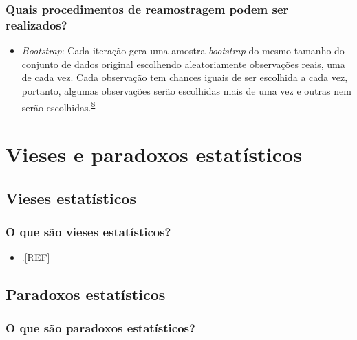 \documentclass[
  a4paper,
]{book}
\providecommand{\tightlist}{%
  \setlength{\itemsep}{0pt}\setlength{\parskip}{0pt}}
\begin{document}
\hypertarget{quais-procedimentos-de-reamostragem-podem-ser-realizados}{%
\subsection{Quais procedimentos de reamostragem podem ser realizados?}\label{quais-procedimentos-de-reamostragem-podem-ser-realizados}}

\begin{itemize}
\tightlist
\item
  \emph{Bootstrap}: Cada iteração gera uma amostra \emph{bootstrap} do mesmo tamanho do conjunto de dados original escolhendo aleatoriamente observações reais, uma de cada vez. Cada observação tem chances iguais de ser escolhida a cada vez, portanto, algumas observações serão escolhidas mais de uma vez e outras nem serão escolhidas.\textsuperscript{\protect\hyperlink{ref-Bland2015}{8}}
\end{itemize}

\hypertarget{vieses-paradoxos-estatuxedsticos}{%
\chapter{\texorpdfstring{\textbf{Vieses e paradoxos estatísticos}}{Vieses e paradoxos estatísticos}}\label{vieses-paradoxos-estatuxedsticos}}

\hypertarget{vieses-estatisticos}{%
\section{Vieses estatísticos}\label{vieses-estatisticos}}

\hypertarget{o-que-suxe3o-vieses-estatuxedsticos}{%
\subsection{O que são vieses estatísticos?}\label{o-que-suxe3o-vieses-estatuxedsticos}}

\begin{itemize}
\tightlist
\item
  .{[}REF{]}
\end{itemize}

\hypertarget{paradoxos}{%
\section{Paradoxos estatísticos}\label{paradoxos}}

\hypertarget{o-que-suxe3o-paradoxos-estatuxedsticos}{%
\subsection{O que são paradoxos estatísticos?}\label{o-que-suxe3o-paradoxos-estatuxedsticos}}
\end{document}
